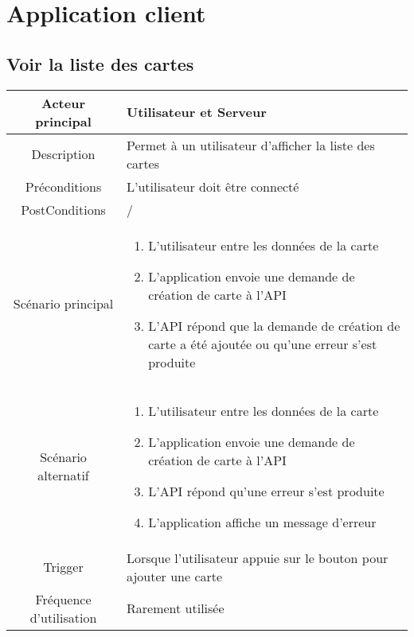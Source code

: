 \documentclass{article}
\begin{document}
\section{Application client}

\subsection{Voir la liste des cartes}
    \begin{table}[h]
        \begin{tabular}{|c|p{10cm}|}
        \hline
        Acteur principal& Utilisateur et Serveur \\
        \hline
        Description& Permet à un utilisateur d'afficher la liste des cartes \\
        \hline
        Préconditions& L'utilisateur doit être connecté  \\
        \hline
        PostConditions&  /    \\
        \hline
        Scénario principal& 
                \begin{enumerate}
                    \item L'utilisateur entre les données de la carte
                    \item L'application envoie une demande de création de carte à l'API
                    \item L'API répond que la demande de création de carte a été ajoutée ou qu'une erreur s'est produite
                \end{enumerate}     \\
        \hline
        Scénario alternatif& 
            \begin{enumerate}
                \item L'utilisateur entre les données de la carte
                \item L'application envoie une demande de création de carte à l'API
                \item L'API répond qu'une erreur s'est produite
                \item L'application affiche un message d'erreur
            \end{enumerate}     \\
        \hline
        Trigger&  Lorsque l'utilisateur appuie sur le bouton pour ajouter une carte   \\
        \hline
        Fréquence d'utilisation& Rarement utilisée  \\
        \hline
        \end{tabular}
    \end{table}
\end{document}
